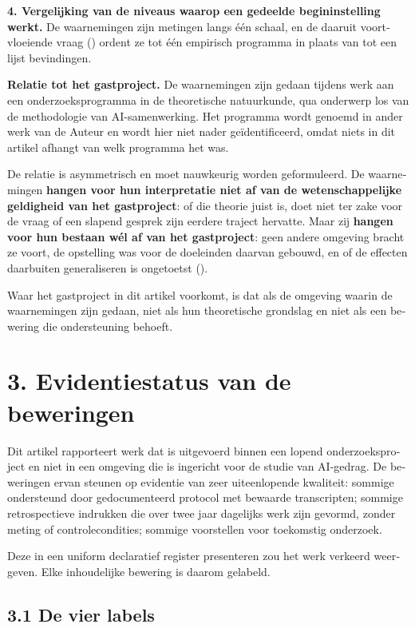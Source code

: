 \begin{dutch}
\textbf{4. Vergelijking van de niveaus waarop een gedeelde begininstelling werkt.} De waarnemingen zijn metingen langs één schaal, en de daaruit voortvloeiende vraag () ordent ze tot één empirisch programma in plaats van tot een lijst bevindingen.

\textbf{Relatie tot het gastproject.} De waarnemingen zijn gedaan tijdens werk aan een onderzoeksprogramma in de theoretische natuurkunde, qua onderwerp los van de methodologie van AI-samenwerking. Het programma wordt genoemd in ander werk van de Auteur en wordt hier niet nader geïdentificeerd, omdat niets in dit artikel afhangt van welk programma het was.

De relatie is asymmetrisch en moet nauwkeurig worden geformuleerd. De waarnemingen \textbf{hangen voor hun interpretatie niet af van de wetenschappelijke geldigheid van het gastproject}: of die theorie juist is, doet niet ter zake voor de vraag of een slapend gesprek zijn eerdere traject hervatte. Maar zij \textbf{hangen voor hun bestaan wél af van het gastproject}: geen andere omgeving bracht ze voort, de opstelling was voor de doeleinden daarvan gebouwd, en of de effecten daarbuiten generaliseren is ongetoetst ().

Waar het gastproject in dit artikel voorkomt, is dat als de omgeving waarin de waarnemingen zijn gedaan, niet als hun theoretische grondslag en niet als een bewering die ondersteuning behoeft.


\section*{3. Evidentiestatus van de beweringen}
\label{sec:nl:3}

Dit artikel rapporteert werk dat is uitgevoerd binnen een lopend onderzoeksproject en niet in een omgeving die is ingericht voor de studie van AI-gedrag. De beweringen ervan steunen op evidentie van zeer uiteenlopende kwaliteit: sommige ondersteund door gedocumenteerd protocol met bewaarde transcripten; sommige retrospectieve indrukken die over twee jaar dagelijks werk zijn gevormd, zonder meting of controlecondities; sommige voorstellen voor toekomstig onderzoek.

Deze in een uniform declaratief register presenteren zou het werk verkeerd weergeven. Elke inhoudelijke bewering is daarom gelabeld.


\subsection*{3.1 De vier labels}
\label{sec:nl:3.1}


\end{dutch}
